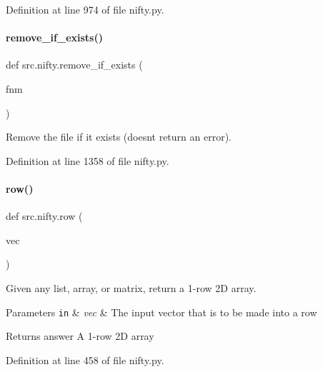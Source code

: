 Definition at line 974 of file nifty.\+py.

\mbox{\label{namespacesrc_1_1nifty_ae667a525ff42b8bca1fc20024c7a5f5c}} 
\paragraph{\texorpdfstring{remove\+\_\+if\+\_\+exists()}{remove\_if\_exists()}}
{\footnotesize\ttfamily def src.\+nifty.\+remove\+\_\+if\+\_\+exists (\begin{DoxyParamCaption}\item[{}]{fnm }\end{DoxyParamCaption})}



Remove the file if it exists (doesn\textquotesingle{}t return an error). 



Definition at line 1358 of file nifty.\+py.

\mbox{\label{namespacesrc_1_1nifty_a79d09a2aade73af50632d594f4826e11}} 
\paragraph{\texorpdfstring{row()}{row()}}
{\footnotesize\ttfamily def src.\+nifty.\+row (\begin{DoxyParamCaption}\item[{}]{vec }\end{DoxyParamCaption})}



Given any list, array, or matrix, return a 1-\/row 2D array. 


\begin{DoxyParams}[1]{Parameters}
\mbox{\tt in}  & {\em vec} & The input vector that is to be made into a row\\
\hline
\end{DoxyParams}
\begin{DoxyReturn}{Returns}
answer A 1-\/row 2D array 
\end{DoxyReturn}


Definition at line 458 of file nifty.\+py.

